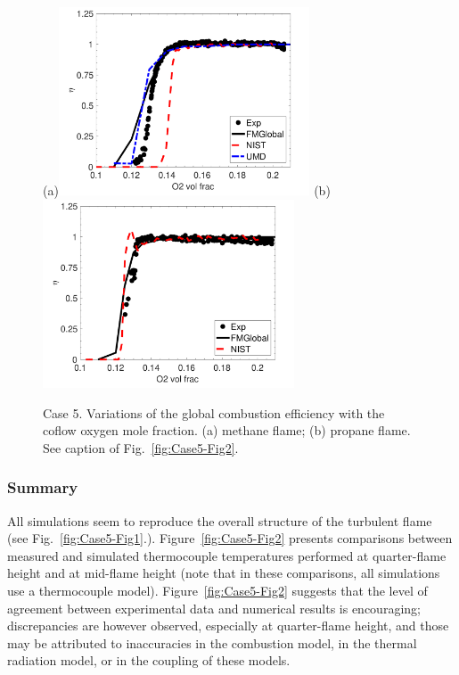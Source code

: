 \begin{figure}
\centering
(a)\includegraphics[height=2.2in]{Figures/Case5-Fig3a.pdf}
(b)\includegraphics[height=2.2in]{Figures/Case5-Fig3b.pdf}
\caption{Case 5. Variations of the global combustion efficiency with the coflow oxygen mole fraction. (a) methane flame; (b) propane flame. See caption of Fig.~\ref{fig:Case5-Fig2}.}
\label{fig:Case5-Fig3}
\end{figure}

\subsubsection{Summary}

All simulations seem to reproduce the overall structure of the turbulent flame (see Fig.~\ref{fig:Case5-Fig1}.). Figure~\ref{fig:Case5-Fig2} presents comparisons between measured and simulated thermocouple temperatures performed at quarter-flame height and at mid-flame height (note that in these comparisons, all simulations use a thermocouple model). Figure~\ref{fig:Case5-Fig2} suggests that the level of agreement between experimental data and numerical results is encouraging; discrepancies are however observed, especially at quarter-flame height, and those may be attributed to inaccuracies in the combustion model, in the thermal radiation model, or in the coupling of these models.

